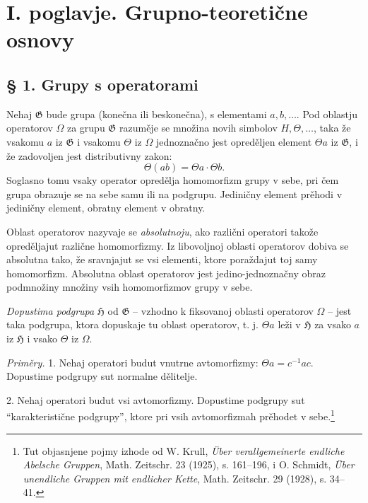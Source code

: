 \documentclass[11pt]{article}
\providecommand{\mG}{\mathfrak{G}}
\providecommand{\mH}{\mathfrak{H}}
\begin{document}
\setcounter{footnote}{5}

\section*{I. poglavje. Grupno-teoretične osnovy}

\subsection*{§ 1. Grupy s operatorami}

Nehaj $\mG$ bude grupa (konečna ili beskonečna), s elementami $a,b,\ldots$. Pod oblastju operatorov $\Omega$ za grupu $\mG$ razuměje se množina novih simbolov $H,\Theta,\ldots$, taka že vsakomu $a$ iz $\mG$ i vsakomu $\Theta$ iz $\Omega$ jednoznačno jest opreděljen element $\Theta a$ iz $\mG$, i že zadovoljen jest distributivny zakon:
\[
        \Theta(ab)=\Theta a\cdot\Theta b.
\]
Soglasno tomu vsaky operator opredělja homomorfizm grupy v sebe, pri čem grupa obrazuje se na sebe samu ili na podgrupu. Jediničny element prěhodi v jediničny element, obratny element v obratny.

Oblast operatorov nazyvaje se \emph{absolutnoju}, ako različni operatori takože opreděljajut različne homomorfizmy. Iz libovoljnoj oblasti operatorov dobiva se absolutna tako, že sravnjajut se vsi elementi, ktore poraždajut toj samy homomorfizm. Absolutna oblast operatorov jest jedino-jednoznačny obraz podmnožiny množiny vsih homomorfizmov grupy v sebe.

\emph{Dopustima podgrupa} $\mH$ od $\mG$ -- vzhodno k fiksovanoj oblasti operatorov $\Omega$ -- jest taka podgrupa, ktora dopuskaje tu oblast operatorov, t. j. $\Theta a$ leži v $\mH$ za vsako $a$ iz $\mH$ i vsako $\Theta$ iz $\Omega$.

\emph{Priměry.} 1. Nehaj operatori budut vnutrne avtomorfizmy: $\Theta a=c^{-1}ac$. Dopustime podgrupy sut normalne dělitelje.

2. Nehaj operatori budut vsi avtomorfizmy. Dopustime podgrupy sut “karakteristične podgrupy”, ktore pri vsih avtomorfizmah prěhodet v sebe.\footnote{Tut objasnjene pojmy izhode od W. Krull, \emph{Über verallgemeinerte endliche Abelsche Gruppen}, Math. Zeitschr. 23 (1925), s. 161--196, i O. Schmidt, \emph{Über unendliche Gruppen mit endlicher Kette}, Math. Zeitschr. 29 (1928), s. 34--41.}
\end{document}
